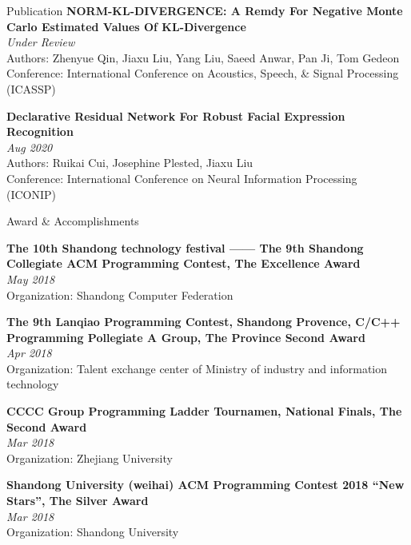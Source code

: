 \documentclass{resume} %
\begin{document}
\begin{rSection}{Publication}
{\bf NORM-KL-DIVERGENCE: A Remdy For Negative Monte Carlo Estimated Values Of KL-Divergence}\\ \hfill {\em Under Review}\\
{Authors: Zhenyue Qin, Jiaxu Liu, Yang Liu, Saeed Anwar, Pan Ji, Tom Gedeon}\\
{Conference: International Conference on Acoustics, Speech, \& Signal Processing (ICASSP)}

{\bf Declarative Residual Network For Robust Facial Expression Recognition}\\ \hfill {\em Aug 2020}\\
{Authors: Ruikai Cui, Josephine Plested, Jiaxu Liu}\\
{Conference: International Conference on Neural Information Processing (ICONIP)}
\end{rSection}
\begin{rSection}{Award \& Accomplish­ments}

 
{\bf The 10th Shandong technology festival —— The 9th Shandong Collegiate ACM Programming Contest, The Excellence Award}\\ \hfill {\em May 2018}\\
{Organization: Shandong Computer Federation}

{\bf The 9th Lanqiao Programming Contest, Shandong Provence, C/C++ Programming Pollegiate A Group, The Province Second Award}\\ \hfill {\em Apr 2018}\\
{Organization: Talent exchange center of Ministry of industry and information technology}

{\bf CCCC Group Programming Ladder Tournamen, National Finals, The Second Award}\\ \hfill {\em Mar 2018}\\
{Organization: Zhejiang University}

{\bf Shandong University (weihai) ACM Programming Contest 2018 “New Stars”, The Silver Award}\\ \hfill {\em Mar 2018}\\
{Organization: Shandong University}

\end{rSection}
\end{document}

